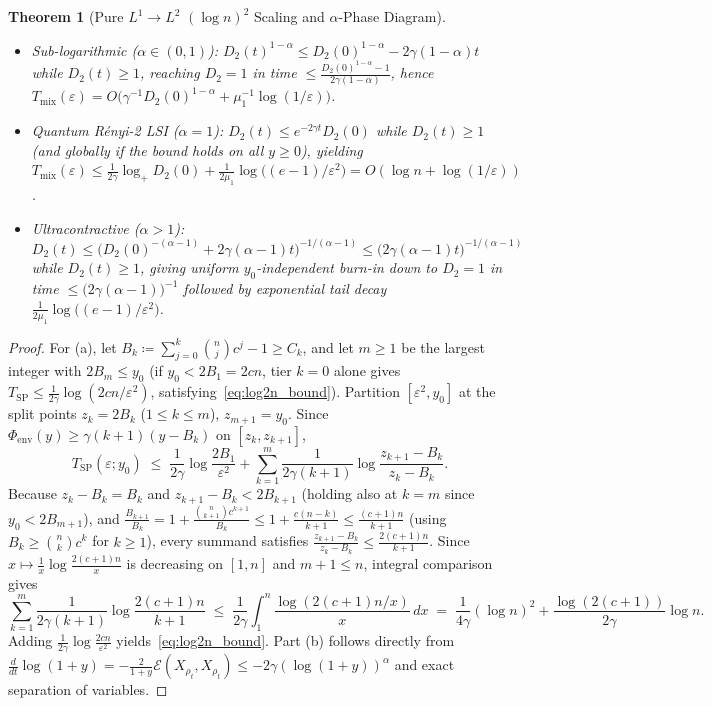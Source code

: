 \documentclass[11pt,a4paper]{article}
\newtheorem{theorem}{Theorem}[section]
\theoremstyle{definition}
\newcommand{\Edir}{\mathcal{E}}
\begin{document}
\begin{theorem}[Pure $L^1 \to L^2$ $(\log n)^2$ Scaling and $\alpha$-Phase Diagram]
\begin{enumerate}[label=(\alph*),leftmargin=2em,itemsep=2pt]
  \begin{itemize}[leftmargin=1.5em,itemsep=1pt]
    \item \emph{Sub-logarithmic ($\alpha \in (0, 1)$):} $D_2(t)^{1-\alpha} \le D_2(0)^{1-\alpha} - 2\gamma(1-\alpha)t$ while $D_2(t) \ge 1$, reaching $D_2 = 1$ in time $\le \frac{D_2(0)^{1-\alpha} - 1}{2\gamma(1-\alpha)}$, hence $T_{\mathrm{mix}}(\varepsilon) = O\bigl(\gamma^{-1} D_2(0)^{1-\alpha} + \mu_1^{-1}\log(1/\varepsilon)\bigr)$.
    \item \emph{Quantum R\'enyi-2 LSI ($\alpha = 1$):} $D_2(t) \le e^{-2\gamma t} D_2(0)$ while $D_2(t) \ge 1$ (and globally if the bound holds on all $y \ge 0$), yielding $T_{\mathrm{mix}}(\varepsilon) \le \frac{1}{2\gamma}\log_+ D_2(0) + \frac{1}{2\mu_1}\log\bigl((e - 1)/\varepsilon^2\bigr) = O(\log n + \log(1/\varepsilon))$.
    \item \emph{Ultracontractive ($\alpha > 1$):} $D_2(t) \le \bigl(D_2(0)^{-(\alpha-1)} + 2\gamma(\alpha - 1)t\bigr)^{-1/(\alpha-1)} \le \bigl(2\gamma(\alpha - 1)t\bigr)^{-1/(\alpha-1)}$ while $D_2(t) \ge 1$, giving uniform $y_0$-independent burn-in down to $D_2 = 1$ in time $\le \bigl(2\gamma(\alpha - 1)\bigr)^{-1}$ followed by exponential tail decay $\frac{1}{2\mu_1}\log\bigl((e - 1)/\varepsilon^2\bigr)$.
  \end{itemize}
\end{enumerate}
\end{theorem}

\begin{proof}
For (a), let $B_k \coloneqq \sum_{j=0}^k \binom{n}{j} c^j - 1 \ge C_k$, and let $m \ge 1$ be the largest integer with $2 B_m \le y_0$ (if $y_0 < 2 B_1 = 2cn$, tier $k = 0$ alone gives $T_{\mathrm{SP}} \le \frac{1}{2\gamma}\log(2cn/\varepsilon^2)$, satisfying~\eqref{eq:log2n_bound}). Partition $[\varepsilon^2, y_0]$ at the split points $z_k = 2 B_k$ ($1 \le k \le m$), $z_{m+1} = y_0$. Since $\Phi_{\mathrm{env}}(y) \ge \gamma(k+1)(y - B_k)$ on $[z_k, z_{k+1}]$,
\[
  T_{\mathrm{SP}}(\varepsilon; y_0) \;\le\; \frac{1}{2\gamma}\log\frac{2 B_1}{\varepsilon^2}
  + \sum_{k=1}^{m} \frac{1}{2\gamma(k+1)}\log\frac{z_{k+1} - B_k}{z_k - B_k}.
\]
Because $z_k - B_k = B_k$ and $z_{k+1} - B_k < 2 B_{k+1}$ (holding also at $k = m$ since $y_0 < 2 B_{m+1}$), and $\frac{B_{k+1}}{B_k} = 1 + \frac{\binom{n}{k+1} c^{k+1}}{B_k} \le 1 + \frac{c(n - k)}{k + 1} \le \frac{(c + 1)n}{k + 1}$ (using $B_k \ge \binom{n}{k} c^k$ for $k \ge 1$), every summand satisfies $\frac{z_{k+1} - B_k}{z_k - B_k} \le \frac{2(c+1)n}{k+1}$. Since $x \mapsto \frac{1}{x}\log\frac{2(c+1)n}{x}$ is decreasing on $[1, n]$ and $m + 1 \le n$, integral comparison gives
\[
  \sum_{k=1}^{m} \frac{1}{2\gamma(k+1)}\log\frac{2(c+1)n}{k+1}
  \;\le\; \frac{1}{2\gamma}\int_1^n \frac{\log(2(c+1)n/x)}{x}\,dx
  \;=\; \frac{1}{4\gamma}(\log n)^2 + \frac{\log(2(c+1))}{2\gamma}\log n.
\]
Adding $\frac{1}{2\gamma}\log\frac{2 c n}{\varepsilon^2}$ yields~\eqref{eq:log2n_bound}. Part (b) follows directly from $\frac{d}{dt}\log(1 + y) = -\frac{2}{1+y}\Edir(X_{\rho_t}, X_{\rho_t}) \le -2\gamma(\log(1+y))^\alpha$ and exact separation of variables.
\end{proof}
\end{document}
